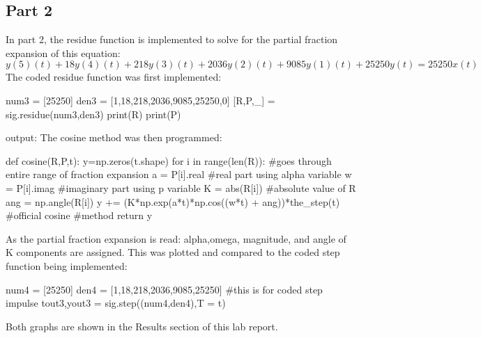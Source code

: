 \documentclass[12pt]{article}
\begin{document}
  \subsection{Part 2}
In part 2, the residue function is implemented to solve for the partial fraction expansion of this equation:
\[y(5)(t) + 18y(4)(t) + 218y(3)(t) + 2036y(2)(t) + 9085y(1)(t) + 25250y(t) = 25250x(t)\]
The coded residue function was first implemented:
\begin{python}
num3 = [25250]
den3 = [1,18,218,2036,9085,25250,0]
[R,P,_] = sig.residue(num3,den3)
print(R)
print(P)
\end{python}
output:\newline
[ 1.        +0.j         -0.48557692+0.72836538j -0.48557692-0.72836538j\newline
 -0.21461963+0.j          0.09288674-0.04765193j  0.09288674+0.04765193j]\newline
[  0. +0.j  -3. +4.j  -3. -4.j -10. +0.j  -1.+10.j  -1.-10.j]\newline
The cosine method was then programmed:
\begin{python}
def cosine(R,P,t):
    y=np.zeros(t.shape)
    for i in range(len(R)): #goes through entire range of fraction expansion
        a = P[i].real #real part using alpha variable
        w = P[i].imag #imaginary part using p variable
        K = abs(R[i]) #absolute value of R
        ang = np.angle(R[i])
        y += (K*np.exp(a*t)*np.cos((w*t) + ang))*the_step(t) #official cosine 
        #method
    return y
\end{python}
As the partial fraction expansion is read: alpha,omega, magnitude, and angle of K components are assigned.
This was plotted and compared to the coded step function being implemented:
\begin{python}
num4 = [25250]
den4 = [1,18,218,2036,9085,25250] #this is for coded step impulse
tout3,yout3 = sig.step((num4,den4),T = t)
\end{python}
Both graphs are shown in the Results section of this lab report.
\end{document}
